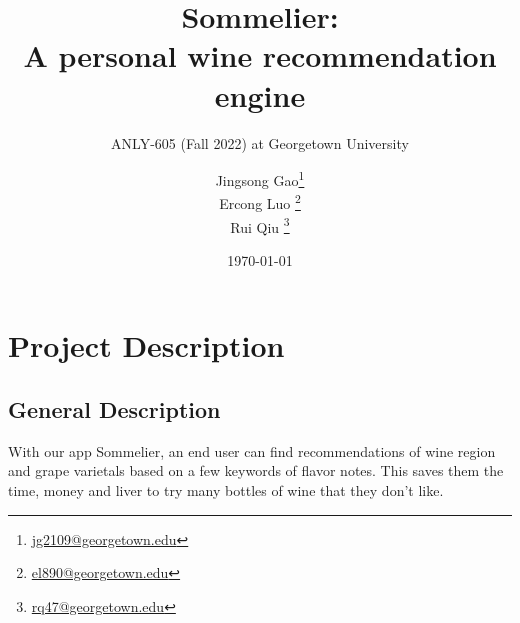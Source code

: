 \documentclass[
	a4paper,
	fontsize=10pt, %
	twoside=false, %
	secnumdepth=2, %
]{kaohandt}
\begin{document}

\title[]{Sommelier:\\ A personal wine recommendation engine}
\subtitle{ANLY-605 (Fall 2022) at Georgetown University}

\author[JG, EL, RQ]{Jingsong Gao\thanks{\href{mailto:jg2109@georgetown.edu}{jg2109@georgetown.edu}}\\
Ercong Luo \thanks{\href{mailto:el890@georgetown.edu}{el890@georgetown.edu}}\\
Rui Qiu \thanks{\href{mailto:rq47@georgetown.edu}{rq47@georgetown.edu}}}

\date{\today}


\maketitle
\newpage
\tableofcontents
\listoffigures %
\listoftables %
\newpage




\medskip


\section{Project Description}

\subsection{General Description}

With our app Sommelier, an end user can find recommendations of wine region and grape varietals based on a few keywords of flavor notes. This saves them the time, money and liver to try many bottles of wine that they don’t like.
\end{document}
